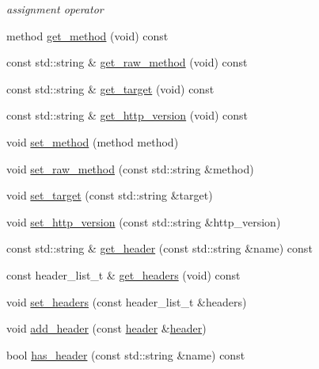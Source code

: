 \begin{DoxyCompactItemize}
\begin{DoxyCompactList}\small\item\em assignment operator \end{DoxyCompactList}\item 
method \hyperlink{classnetflex_1_1http_1_1request_a465930c432dc303f6767858e971eda56}{get\+\_\+method} (void) const
\item 
const std\+::string \& \hyperlink{classnetflex_1_1http_1_1request_a708887a8c3a3582dbec9e1e5e2ec7b0b}{get\+\_\+raw\+\_\+method} (void) const
\item 
const std\+::string \& \hyperlink{classnetflex_1_1http_1_1request_aed90cb36a29b9bd2b0346ba0f399615a}{get\+\_\+target} (void) const
\item 
const std\+::string \& \hyperlink{classnetflex_1_1http_1_1request_ab0cabbb537eb7470d06f4c8039d0e7cb}{get\+\_\+http\+\_\+version} (void) const
\item 
void \hyperlink{classnetflex_1_1http_1_1request_a7210ff25735da523403171152ff653d4}{set\+\_\+method} (method method)
\item 
void \hyperlink{classnetflex_1_1http_1_1request_ad7e544191ac0fc2b97460265bccb4353}{set\+\_\+raw\+\_\+method} (const std\+::string \&method)
\item 
void \hyperlink{classnetflex_1_1http_1_1request_ab8d678abf27538c7b3d7aade35496b06}{set\+\_\+target} (const std\+::string \&target)
\item 
void \hyperlink{classnetflex_1_1http_1_1request_ab2c0c3caea31016028defd3b76035bd3}{set\+\_\+http\+\_\+version} (const std\+::string \&http\+\_\+version)
\item 
const std\+::string \& \hyperlink{classnetflex_1_1http_1_1request_a5d94ca7f1b6ce44a27c655570f2b8899}{get\+\_\+header} (const std\+::string \&name) const
\item 
const header\+\_\+list\+\_\+t \& \hyperlink{classnetflex_1_1http_1_1request_a20a9b71acd61945261bbeaf81a73caf8}{get\+\_\+headers} (void) const
\item 
void \hyperlink{classnetflex_1_1http_1_1request_aacda09c64841cb272c08262b6bae68a8}{set\+\_\+headers} (const header\+\_\+list\+\_\+t \&headers)
\item 
void \hyperlink{classnetflex_1_1http_1_1request_a18b1513d2b6a274cae832ad13dbe7760}{add\+\_\+header} (const \hyperlink{structnetflex_1_1http_1_1header}{header} \&\hyperlink{structnetflex_1_1http_1_1header}{header})
\item 
bool \hyperlink{classnetflex_1_1http_1_1request_a906fb3043367133866daa9f18ad97393}{has\+\_\+header} (const std\+::string \&name) const

\end{DoxyCompactItemize}
